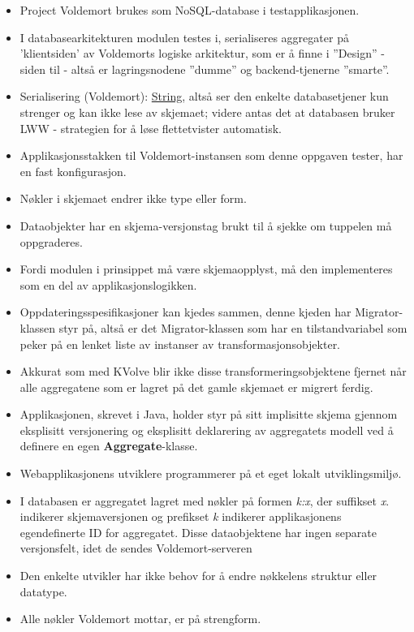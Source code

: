 \begin{itemize}
  \item Project Voldemort brukes som NoSQL-database i testapplikasjonen.
  \item I databasearkitekturen modulen testes i, serialiseres aggregater på 'klientsiden' av Voldemorts logiske arkitektur, som er å finne i ''Design'' - siden til \cite{kreps2009} - altså er lagringsnodene ''dumme'' og backend-tjenerne ''smarte''.
  \item Serialisering (Voldemort): \underline{String}, altså ser den enkelte databasetjener kun strenger og kan ikke lese av skjemaet; videre antas det at databasen bruker LWW - strategien for å løse flettetvister automatisk.
  \item Applikasjonsstakken til Voldemort-instansen som denne oppgaven tester, har en fast konfigurasjon.
  \item Nøkler i skjemaet endrer ikke type eller form.
  \item Dataobjekter har en skjema-versjonstag brukt til å sjekke om tuppelen må oppgraderes.
  \item Fordi modulen i prinsippet må være skjemaopplyst, må den implementeres som en del av applikasjonslogikken.
  \item Oppdateringsspesifikasjoner kan kjedes sammen, denne kjeden har Migrator-klassen styr på, altså er det Migrator-klassen som har en tilstandvariabel som peker på en lenket liste av instanser av transformasjonsobjekter.
  \item Akkurat som med KVolve blir ikke disse transformeringsobjektene fjernet når alle aggregatene som er lagret på det gamle skjemaet er migrert ferdig.
  \item Applikasjonen, skrevet i Java, holder styr på sitt implisitte skjema gjennom eksplisitt versjonering og eksplisitt deklarering av aggregatets modell ved å definere en egen \textbf{Aggregate}-klasse.
  \item Webapplikasjonens utviklere programmerer på et eget lokalt utviklingsmiljø.
  \item I databasen er aggregatet lagret med nøkler på formen \emph{k:x}, der suffikset \emph{x}. indikerer skjemaversjonen og prefikset \emph{k} indikerer applikasjonens egendefinerte ID for aggregatet. Disse dataobjektene har ingen separate versjonsfelt, idet de sendes Voldemort-serveren
  \item Den enkelte utvikler har ikke behov for å endre nøkkelens struktur eller datatype.
  \item Alle nøkler Voldemort mottar, er på strengform.

\end{itemize}
